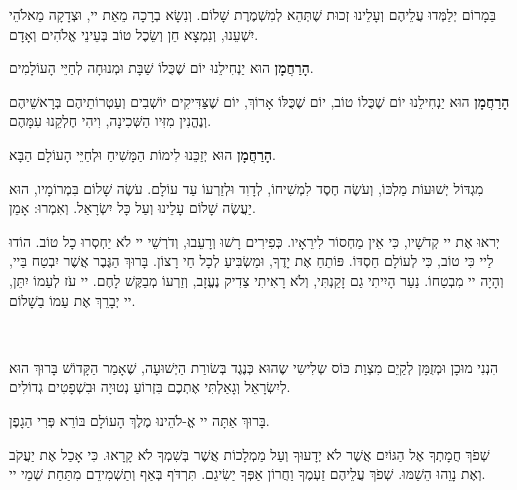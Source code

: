 בַּמָרוֹם יְלַמְּדוּ עֲלֵיהֶם וְעָלֵינוּ זְכוּת שֶׁתְּהֵא לְמִשְׁמֶרֶת שָׁלוֹם. וְנִשָׂא בְרָכָה מֵאֵת יי, וּצְדָקָה מֵאלֹהֵי יִשְׁעֵנוּ, וְנִמְצָא חֵן וְשֵׂכֶל טוֹב בְּעֵינֵי אֱלֹהִים וְאָדָם.


\begin{framed}

{\bf הָרַחֲמָן}
הוּא יַנְחִילֵנוּ יוֹם שֶׁכֻּלוֹ שַׁבָּת וּמְנוּחָה לְחַיֵּי הָעוֹלָמִים.
\end{framed}

{\bf הָרַחֲמָן}
הוּא יַנְחִילֵנוּ יוֹם שֶׁכֻּלוֹ טוֹב, יוֹם שֶׁכֻּלּוֹ אָרוֹךְ, יוֹם שֶׁצַּדִּיקִים יוֹשְׁבִים וְעַטְרוֹתֵיהֶם בְּרָאשֵׁיהֶם וְנֶהֱנִין מִזִּיו הַשְּׁכִינָה, וִיהִי חֶלְקֵנוּ עִמָּהֶם.

{\bf הָרַחֲמָן}
הוּא יְזַכֵּנוּ לִימוֹת הַמָּשִׁיחַ וּלְחַיֵּי הָעוֹלָם הַבָּא.

מִגְדּוֹל יְשׁוּעוֹת מַלְכּוֹ, וְעֹשֶׂה חֶסֶד לִמְשִׁיחוֹ, לְדָוִד וּלְזַרְעוֹ עַד עוֹלָם. עֹשֶׂה שָׁלוֹם בִּמְרוֹמָיו, הוּא יַעֲשֶׂה שָׁלוֹם עָלֵינוּ וְעַל כָּל יִשְׂרָאַל. וְאִמְרוּ: אָמֵן.

יְראוּ אֶת יי קְדֹשָׁיו, כִּי אֵין מַחְסוֹר לִירֵאָיו. כְּפִירִים רָשׁוּ וְרָעֵבוּ, וְדֹרְשֵׁי יי לֹא יַחְסְרוּ כָל טוֹב. הוֹדוּ לַיי כִּי טוֹב, כִּי לְעוֹלָם חַסְדּוֹ. פּוֹתֵחַ אֶת יָדֶךָ, וּמַשְׂבִּיעַ לְכָל חַי רָצוֹן. בָּרוּךְ הַגֶּבֶר אֲשֶׁר יִבְטַח בַּיי, וְהָיָה יי מִבְטַחוֹ. נַעַר הָיִיתִי גַם זָקַנְתִּי, וְלֹא רָאִיתִי צַדִיק נֶעֱזָב, וְזַרְעוֹ מְבַקֶּשׁ לָחֶם. יי עֹז לְעַמוֹ יִתֵּן, יי יְבָרֵךְ אֶת עַמוֹ בַשָׁלוֹם.

\ \\


הִנְנִי מוּכָן וּמְזֻמָּן לְקַיֵם מִצְוַת כּוֹס שְלִישִי שֶהוּא כְּנֶגֶד בְּשׂורַת הַיְשׁוּעָה, שֶׁאָמַר הַקָּדוֹשׁ בָּרוּךְ הוּא לְיִשְׂרָאֵל וְגָאַלְתִּי אֶתְכֶם בִּזְרוֹעַ נְטוּיָה וּבִשְׁפָטִים גְדוֹלִים.

בָּרוּךְ אַתָּה יי אֱ-לֹהֵינוּ מֶלֶךְ הָעוֹלָם בּוֹרֵא פְּרִי הַגָפֶן.



שְׁפֹךְ חֲמָתְךָ אֶל הַגּוֹיִם אֲשֶׁר לֹא יְדָעוּךָ וְעַל מַמְלָכוֹת אֲשֶׁר בְּשִׁמְךָ לֹא קָרָאוּ. כִּי אָכַל אֶת יַעֲקֹב וְאֶת נָוֵהוּ הֵשַׁמּוּ. שְׁפֹךְ עֲלֵיהֶם זַעְמֶךָ וַחֲרוֹן אַפְּךָ יַשִׂיגֵם. תִּרְדֹּף בְּאַף וְתַשְׁמִידֵם מִתַּחַת שְׁמֵי יי.